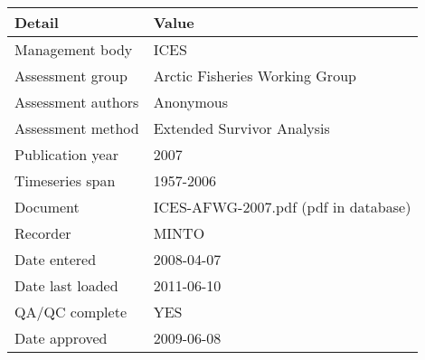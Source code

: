 \begin{table}[htb]
\centering
\begin{tabular}{lp{7cm}}
\toprule
Detail & Value \\
\midrule
Management body    & ICES                                 \\
Assessment group   & Arctic Fisheries Working Group       \\
Assessment authors & Anonymous                            \\
Assessment method  & Extended Survivor Analysis           \\
Publication year   & 2007                                 \\
Timeseries span    & 1957-2006                            \\
Document           & ICES-AFWG-2007.pdf (pdf in database) \\
Recorder           & MINTO                                \\
Date entered       & 2008-04-07                           \\
Date last loaded   & 2011-06-10                           \\
QA/QC complete     & YES                                  \\
Date approved      & 2009-06-08                           \\
\bottomrule
\end{tabular}
\label{tab:assessdet}
\end{table}
